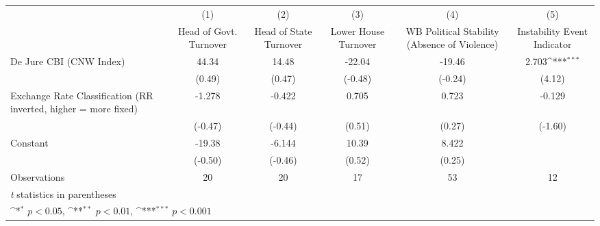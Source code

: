 {
\def\sym#1{\ifmmode^{#1}\else\(^{#1}\)\fi}
\begin{tabular}{l*{5}{c}}
\hline\hline
                &\multicolumn{1}{c}{(1)}&\multicolumn{1}{c}{(2)}&\multicolumn{1}{c}{(3)}&\multicolumn{1}{c}{(4)}&\multicolumn{1}{c}{(5)}\\
                &\multicolumn{1}{c}{Head of Govt. Turnover}&\multicolumn{1}{c}{Head of State Turnover}&\multicolumn{1}{c}{Lower House Turnover}&\multicolumn{1}{c}{WB Political Stability (Absence of Violence)}&\multicolumn{1}{c}{Instability Event Indicator}\\
\hline
De Jure CBI (CNW Index)&    44.34         &    14.48         &   -22.04         &   -19.46         &    2.703\sym{***}\\
                &   (0.49)         &   (0.47)         &  (-0.48)         &  (-0.24)         &   (4.12)         \\
[1em]
Exchange Rate Classification (RR inverted, higher = more fixed)&   -1.278         &   -0.422         &    0.705         &    0.723         &   -0.129         \\
                &  (-0.47)         &  (-0.44)         &   (0.51)         &   (0.27)         &  (-1.60)         \\
[1em]
Constant        &   -19.38         &   -6.144         &    10.39         &    8.422         &                  \\
                &  (-0.50)         &  (-0.46)         &   (0.52)         &   (0.25)         &                  \\
\hline
Observations    &       20         &       20         &       17         &       53         &       12         \\
\hline\hline
\multicolumn{6}{l}{\footnotesize \textit{t} statistics in parentheses}\\
\multicolumn{6}{l}{\footnotesize \sym{*} \(p<0.05\), \sym{**} \(p<0.01\), \sym{***} \(p<0.001\)}\\
\end{tabular}
}
